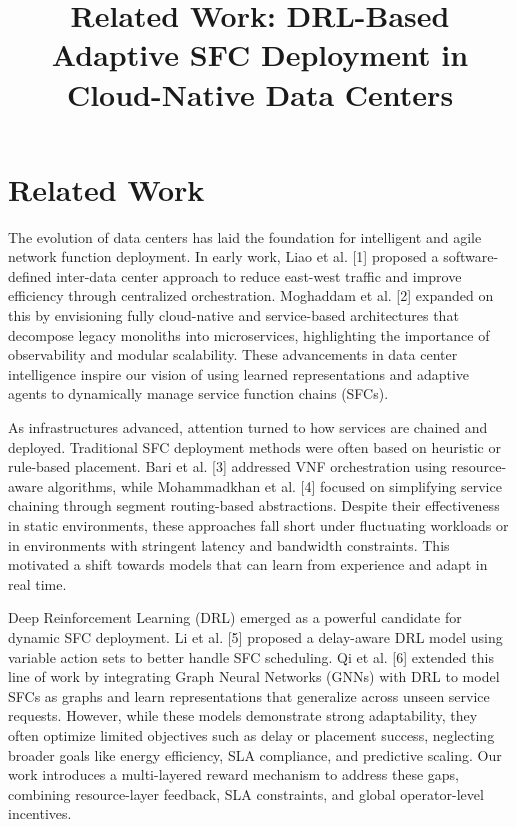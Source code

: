 \documentclass[conference]{IEEEtran}
\begin{document}
\title{Related Work: DRL-Based Adaptive SFC Deployment in Cloud-Native Data Centers}

\author{
}

\maketitle

\section{Related Work}

The evolution of data centers has laid the foundation for intelligent and agile network function deployment. In early work, Liao et al. [1] proposed a software-defined inter-data center approach to reduce east-west traffic and improve efficiency through centralized orchestration. Moghaddam et al. [2] expanded on this by envisioning fully cloud-native and service-based architectures that decompose legacy monoliths into microservices, highlighting the importance of observability and modular scalability. These advancements in data center intelligence inspire our vision of using learned representations and adaptive agents to dynamically manage service function chains (SFCs).

As infrastructures advanced, attention turned to how services are chained and deployed. Traditional SFC deployment methods were often based on heuristic or rule-based placement. Bari et al. [3] addressed VNF orchestration using resource-aware algorithms, while Mohammadkhan et al. [4] focused on simplifying service chaining through segment routing-based abstractions. Despite their effectiveness in static environments, these approaches fall short under fluctuating workloads or in environments with stringent latency and bandwidth constraints. This motivated a shift towards models that can learn from experience and adapt in real time.

Deep Reinforcement Learning (DRL) emerged as a powerful candidate for dynamic SFC deployment. Li et al. [5] proposed a delay-aware DRL model using variable action sets to better handle SFC scheduling. Qi et al. [6] extended this line of work by integrating Graph Neural Networks (GNNs) with DRL to model SFCs as graphs and learn representations that generalize across unseen service requests. However, while these models demonstrate strong adaptability, they often optimize limited objectives such as delay or placement success, neglecting broader goals like energy efficiency, SLA compliance, and predictive scaling. Our work introduces a multi-layered reward mechanism to address these gaps, combining resource-layer feedback, SLA constraints, and global operator-level incentives.
\end{document}
